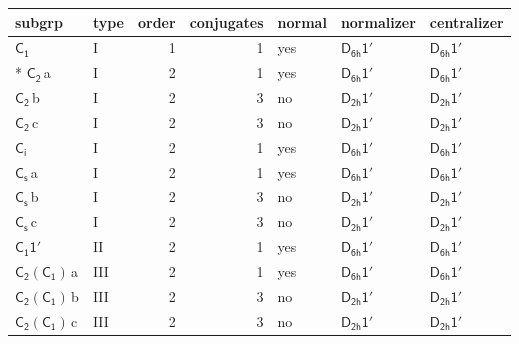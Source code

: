\documentclass[10pt,a4paper]{article}
\numberwithin{equation}{section}
\newcommand{\grp}[1]{\mathsf{#1}}
\newcommand{\clsletter}[1]{\,{\scriptsize\color{black!55}#1}}
\begin{document}
{\small\begin{longtable}{@{}llrrlll@{}}\toprule
subgrp & type & order & conjugates & normal & normalizer & centralizer\\\midrule\endhead
\bottomrule\endfoot\endlastfoot
\href{../../../rotation/data/pdf/C1.pdf}{$\grp{C_{1}}$} & I & 1 & 1 & yes & \href{D6h-1p.pdf}{$\grp{D_{6h}1'}$} & \href{D6h-1p.pdf}{$\grp{D_{6h}1'}$}\\*
\href{../../../rotation/data/pdf/C2.pdf}{$\grp{C_{2}}$}\clsletter{a} & I & 2 & 1 & yes & \href{D6h-1p.pdf}{$\grp{D_{6h}1'}$} & \href{D6h-1p.pdf}{$\grp{D_{6h}1'}$}\\
\href{../../../rotation/data/pdf/C2.pdf}{$\grp{C_{2}}$}\clsletter{b} & I & 2 & 3 & no & \href{D2h-1p.pdf}{$\grp{D_{2h}1'}$} & \href{D2h-1p.pdf}{$\grp{D_{2h}1'}$}\\
\href{../../../rotation/data/pdf/C2.pdf}{$\grp{C_{2}}$}\clsletter{c} & I & 2 & 3 & no & \href{D2h-1p.pdf}{$\grp{D_{2h}1'}$} & \href{D2h-1p.pdf}{$\grp{D_{2h}1'}$}\\
\href{../../../rotation/data/pdf/S2.pdf}{$\grp{C_{i}}$} & I & 2 & 1 & yes & \href{D6h-1p.pdf}{$\grp{D_{6h}1'}$} & \href{D6h-1p.pdf}{$\grp{D_{6h}1'}$}\\
\href{../../../rotation/data/pdf/C1v.pdf}{$\grp{C_{s}}$}\clsletter{a} & I & 2 & 1 & yes & \href{D6h-1p.pdf}{$\grp{D_{6h}1'}$} & \href{D6h-1p.pdf}{$\grp{D_{6h}1'}$}\\
\href{../../../rotation/data/pdf/C1v.pdf}{$\grp{C_{s}}$}\clsletter{b} & I & 2 & 3 & no & \href{D2h-1p.pdf}{$\grp{D_{2h}1'}$} & \href{D2h-1p.pdf}{$\grp{D_{2h}1'}$}\\
\href{../../../rotation/data/pdf/C1v.pdf}{$\grp{C_{s}}$}\clsletter{c} & I & 2 & 3 & no & \href{D2h-1p.pdf}{$\grp{D_{2h}1'}$} & \href{D2h-1p.pdf}{$\grp{D_{2h}1'}$}\\
\href{C1-1p.pdf}{$\grp{C_{1}1'}$} & II & 2 & 1 & yes & \href{D6h-1p.pdf}{$\grp{D_{6h}1'}$} & \href{D6h-1p.pdf}{$\grp{D_{6h}1'}$}\\
\href{C2-C1.pdf}{$\grp{C_{2}}(\grp{C_{1}})$}\clsletter{a} & III & 2 & 1 & yes & \href{D6h-1p.pdf}{$\grp{D_{6h}1'}$} & \href{D6h-1p.pdf}{$\grp{D_{6h}1'}$}\\
\href{C2-C1.pdf}{$\grp{C_{2}}(\grp{C_{1}})$}\clsletter{b} & III & 2 & 3 & no & \href{D2h-1p.pdf}{$\grp{D_{2h}1'}$} & \href{D2h-1p.pdf}{$\grp{D_{2h}1'}$}\\
\href{C2-C1.pdf}{$\grp{C_{2}}(\grp{C_{1}})$}\clsletter{c} & III & 2 & 3 & no & \href{D2h-1p.pdf}{$\grp{D_{2h}1'}$} & \href{D2h-1p.pdf}{$\grp{D_{2h}1'}$}\\

\end{longtable}}
\end{document}
